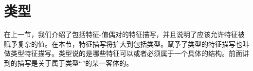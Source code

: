 \section{类型}
\label{sec-formalismus-typen}

在上一节，我们介绍了包括特征-值偶对的特征描写，并且说明了应该允许特征被赋予复杂的值。在本节，特征描写将扩大到包括类型。赋予了类型的特征描写也叫做类型特征描写。类型说的是哪些特征可以或者必须属于一个具体的结构。前面讲到的描写是关于属于类型“”的某一客体的。
\ea
{}
\z

